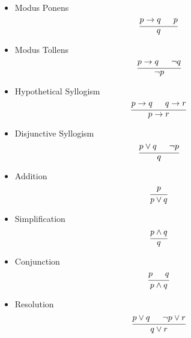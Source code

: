 \documentclass{article}
\theoremstyle{mytheoremstyle}
\theoremstyle{mytheoremstyle}
\theoremstyle{myproblemstyle}
\begin{document}
    \begin{itemize}
        \item Modus Ponens
            \[
                \begin{prooftree}
                    \hypo{p \rightarrow q}
                    \hypo {p}
                    \infer2{q}
                \end{prooftree}
            \]
        \item Modus Tollens
            \[
                \begin{prooftree}
                    \hypo{p \rightarrow q}
                    \hypo{\neg q}
                    \infer2{\neg p}
                \end{prooftree}
            \]
        \item Hypothetical Syllogism
            \[
                \begin{prooftree}
                    \hypo{p \rightarrow q}
                    \hypo{q \rightarrow r}
                    \infer2{p \rightarrow r}
                \end{prooftree}
            \]
        \item Disjunctive Syllogism
            \[
                \begin{prooftree}
                    \hypo{p \vee q}
                    \hypo{\neg p}
                    \infer2{q}
                \end{prooftree}
            \]
        \item Addition
            \[
                \begin{prooftree}
                    \hypo{p}
                    \infer1{p \vee q}
                \end{prooftree}
            \]
        \item Simplification
            \[
                \begin{prooftree}
                    \hypo{p \wedge q}
                    \infer1{q}
                \end{prooftree}
            \]
        \item Conjunction
            \[
                \begin{prooftree}
                    \hypo{p}
                    \hypo{q}
                    \infer2{p \wedge q}
                \end{prooftree}
            \]
        \item Resolution
            \[
                \begin{prooftree}
                    \hypo{p \vee q}
                    \hypo{\neg p \vee r}
                    \infer2{q \vee r}
                \end{prooftree}
            \]
    \end{itemize}
\end{document}
